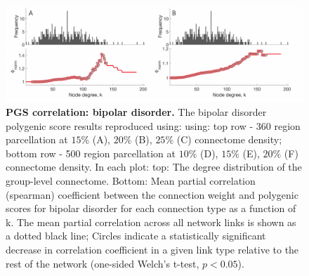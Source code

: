 \begin{figure}[h!]
\begin{center}
\includegraphics[width=1\textwidth]{Chapter5/SFigure5.pdf}%
\end{center}
\caption{\textbf{PGS correlation: bipolar disorder.} 
The bipolar disorder polygenic score results reproduced using: using: top row - 360 region parcellation at $15\%$ (A), $20\%$ (B), $25\%$ (C) connectome density; bottom row - 500 region parcellation at $10\%$ (D), $15\%$ (E), $20\%$ (F) connectome density. In each plot: top: The degree distribution of the group-level connectome. Bottom: Mean partial correlation (spearman) coefficient between the connection weight and polygenic scores for bipolar disorder for each connection type as a function of k. The mean partial correlation across all network links is shown as a dotted black line; Circles indicate a statistically significant decrease in correlation coefficient in a given link type relative to the rest of the network (one-sided Welch's t-test, $p < 0.05$).}
\label{fig:Ch5SFig5}
\end{figure}

